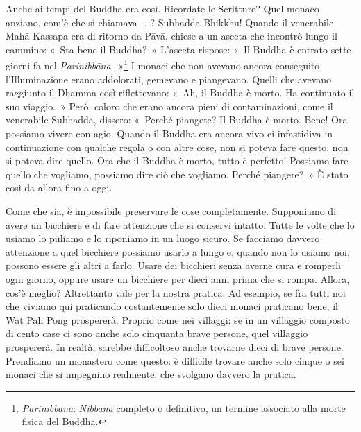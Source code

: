 Anche ai tempi del Buddha era così. Ricordate le Scritture? Quel monaco
anziano, com'è che si chiamava \ldots{} ? Subhadda Bhikkhu! Quando il
venerabile Mahā Kassapa era di ritorno da Pāvā, chiese a un asceta che
incontrò lungo il cammino: «~Sta bene il Buddha?~» L'asceta rispose:
«~Il Buddha è entrato sette giorni fa nel
\emph{Parinibbāna}.~»\footnote{\emph{Parinibbāna}: \emph{Nibbāna}
  completo o definitivo, un termine associato alla morte fisica del
  Buddha.} I monaci che non avevano ancora conseguito l'Illuminazione
erano addolorati, gemevano e piangevano. Quelli che avevano raggiunto il
Dhamma così riflettevano: «~Ah, il Buddha è morto. Ha continuato il suo
viaggio.~» Però, coloro che erano ancora pieni di contaminazioni, come
il venerabile Subhadda, dissero: «~Perché piangete? Il Buddha è morto.
Bene! Ora possiamo vivere con agio. Quando il Buddha era ancora vivo ci
infastidiva in continuazione con qualche regola o con altre cose, non si
poteva fare questo, non si poteva dire quello. Ora che il Buddha è
morto, tutto è perfetto! Possiamo fare quello che vogliamo, possiamo
dire ciò che vogliamo. Perché piangere?~» È stato così da allora fino a
oggi.

Come che sia, è impossibile preservare le cose completamente. Supponiamo
di avere un bicchiere e di fare attenzione che si conservi intatto.
Tutte le volte che lo usiamo lo puliamo e lo riponiamo in un luogo
sicuro. Se facciamo davvero attenzione a quel bicchiere possiamo usarlo
a lungo e, quando non lo usiamo noi, possono essere gli altri a farlo.
Usare dei bicchieri senza averne cura e romperli ogni giorno, oppure
usare un bicchiere per dieci anni prima che si rompa. Allora, cos'è
meglio? Altrettanto vale per la nostra pratica. Ad esempio, se fra tutti
noi che viviamo qui praticando costantemente solo dieci monaci praticano
bene, il Wat Pah Pong prospererà. Proprio come nei villaggi: se in un
villaggio composto di cento case ci sono anche solo cinquanta brave
persone, quel villaggio prospererà. In realtà, sarebbe difficoltoso
anche trovarne dieci di brave persone. Prendiamo un monastero come
questo: è difficile trovare anche solo cinque o sei monaci che si
impegnino realmente, che svolgano davvero la pratica.

